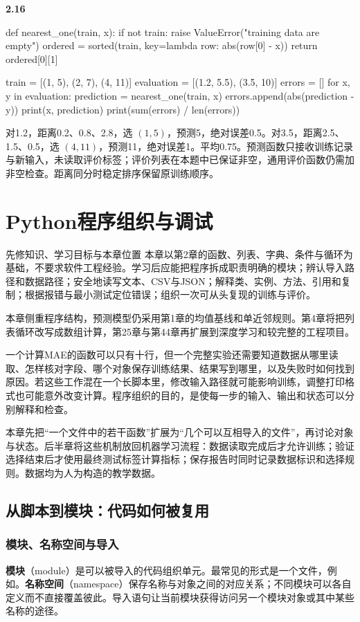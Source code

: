 \documentclass[UTF8,fontset=none,zihao=-4,a4paper]{ctexart}
\newcommand{\chapterpage}[1]{\clearpage\section{#1}}
\newcommand{\term}[1]{\textbf{#1}}
\newcommand{\code}[1]{\texttt{\detokenize{#1}}}
\numberwithin{equation}{section}
\numberwithin{figure}{section}
\begin{document}
\textbf{2.16}\quad
\begin{pycode}
def nearest_one(train, x):
    if not train:
        raise ValueError("training data are empty")
    ordered = sorted(train, key=lambda row: abs(row[0] - x))
    return ordered[0][1]

train = [(1, 5), (2, 7), (4, 11)]
evaluation = [(1.2, 5.5), (3.5, 10)]
errors = []
for x, y in evaluation:
    prediction = nearest_one(train, x)
    errors.append(abs(prediction - y))
    print(x, prediction)
print(sum(errors) / len(errors))
\end{pycode}
对1.2，距离0.2、0.8、2.8，选 $(1,5)$，预测5，绝对误差0.5。对3.5，距离2.5、1.5、0.5，选 $(4,11)$，预测11，绝对误差1。平均0.75。预测函数只接收训练记录与新输入，未读取评价标签；评价列表在本题中已保证非空，通用评价函数仍需加非空检查。距离同分时稳定排序保留原训练顺序。


\renewcommand{\code}[1]{\allowbreak\texttt{\detokenize{#1}}\allowbreak}

\chapterpage{Python程序组织与调试}\label{ch:organization}
\begin{infobox}{先修知识、学习目标与本章位置}
本章以第2章的函数、列表、字典、条件与循环为基础，不要求软件工程经验。学习后应能把程序拆成职责明确的模块；辨认导入路径和数据路径；安全地读写文本、CSV与JSON；解释类、实例、方法、引用和复制；根据报错与最小测试定位错误；组织一次可从头复现的训练与评价。

本章侧重程序结构，预测模型仍采用第1章的均值基线和单近邻规则。第4章将把列表循环改写成数组计算，第25章与第44章再扩展到深度学习和较完整的工程项目。
\end{infobox}
一个计算MAE的函数可以只有十行，但一个完整实验还需要知道数据从哪里读取、怎样核对字段、哪个对象保存训练结果、结果写到哪里，以及失败时如何找到原因。若这些工作混在一个长脚本里，修改输入路径就可能影响训练，调整打印格式也可能意外改变计算。程序组织的目的，是使每一步的输入、输出和状态可以分别解释和检查。

本章先把“一个文件中的若干函数”扩展为“几个可以互相导入的文件”，再讨论对象与状态。后半章将这些机制放回机器学习流程：数据读取完成后才允许训练；验证选择结束后才使用最终测试标签计算指标；保存报告时同时记录数据标识和选择规则。数据均为人为构造的教学数据。

\subsection{从脚本到模块：代码如何被复用}
\subsubsection{模块、名称空间与导入}
\term{模块}（module）是可以被导入的代码组织单元。最常见的形式是一个\code{.py}文件，例如\code{metrics.py}。\term{名称空间}（namespace）保存名称与对象之间的对应关系；不同模块可以各自定义\code{mean}而不直接覆盖彼此。导入语句让当前模块获得访问另一个模块对象或其中某些名称的途径。
\end{document}

